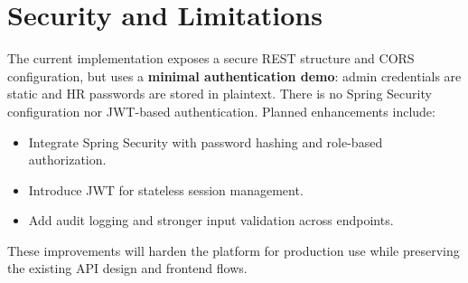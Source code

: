\documentclass[a4paper,12pt]{report}
\begin{document}
\section{Security and Limitations}
\begin{doublespace}
The current implementation exposes a secure REST structure and CORS configuration, but uses a \textbf{minimal authentication demo}: admin credentials are static and HR passwords are stored in plaintext. There is no Spring Security configuration nor JWT-based authentication. Planned enhancements include:
\begin{itemize}
  \item Integrate Spring Security with password hashing and role-based authorization.
  \item Introduce JWT for stateless session management.
  \item Add audit logging and stronger input validation across endpoints.
\end{itemize}
These improvements will harden the platform for production use while preserving the existing API design and frontend flows.
\end{doublespace}

\newpage
\end{document}
